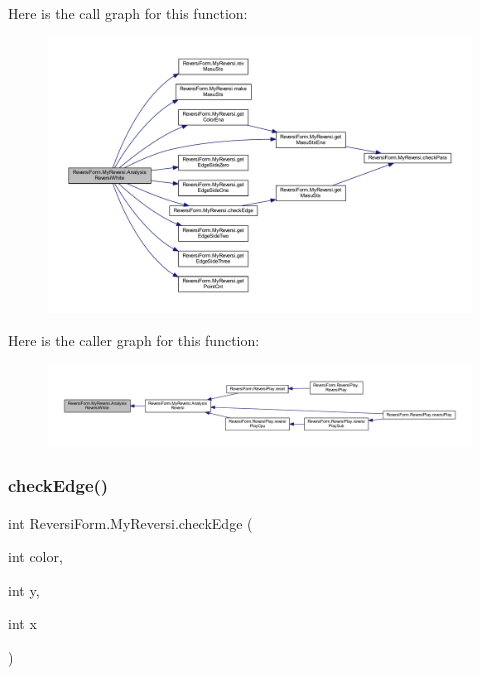 Here is the call graph for this function\+:
\nopagebreak
\begin{figure}[H]
\begin{center}
\leavevmode
\includegraphics[width=350pt]{class_reversi_form_1_1_my_reversi_a2fac17b7121d91063e2d759487f1ed18_cgraph}
\end{center}
\end{figure}
Here is the caller graph for this function\+:
\nopagebreak
\begin{figure}[H]
\begin{center}
\leavevmode
\includegraphics[width=350pt]{class_reversi_form_1_1_my_reversi_a2fac17b7121d91063e2d759487f1ed18_icgraph}
\end{center}
\end{figure}
\mbox{\label{class_reversi_form_1_1_my_reversi_aa626cbf9735559841662c8fc413abb98}} 
\subsubsection{\texorpdfstring{check\+Edge()}{checkEdge()}}
{\footnotesize\ttfamily int Reversi\+Form.\+My\+Reversi.\+check\+Edge (\begin{DoxyParamCaption}\item[{int}]{color,  }\item[{int}]{y,  }\item[{int}]{x }\end{DoxyParamCaption})}



